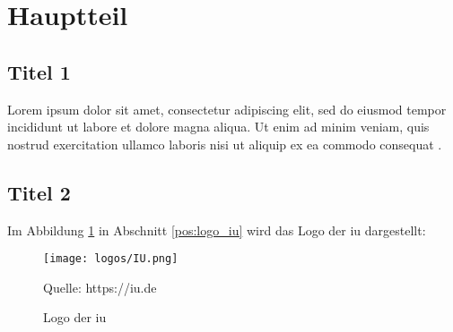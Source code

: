 \section{Hauptteil}

\lipsum[1]

\subsection{Titel 1}

Lorem ipsum dolor sit amet, consectetur adipiscing elit, sed do eiusmod tempor incididunt ut labore et dolore magna aliqua. Ut enim ad minim veniam, quis nostrud exercitation ullamco laboris nisi ut aliquip ex ea commodo consequat \parencite[1]{nussbaum}.


\subsection{Titel 2}

Im Abbildung \ref*{fig:logo_iu} in Abschnitt \ref*{pos:logo_iu} wird das Logo der \ac{iu} dargestellt:

\begin{figure}[ht!]
    \label{pos:logo_iu}
    \texttt{[image: logos/IU.png]}
    \caption[Logo der \acs{iu}]{Logo der \ac{iu}}{Quelle: https://iu.de}
    \label{fig:logo_iu}
\end{figure}


\lipsum[7-8]